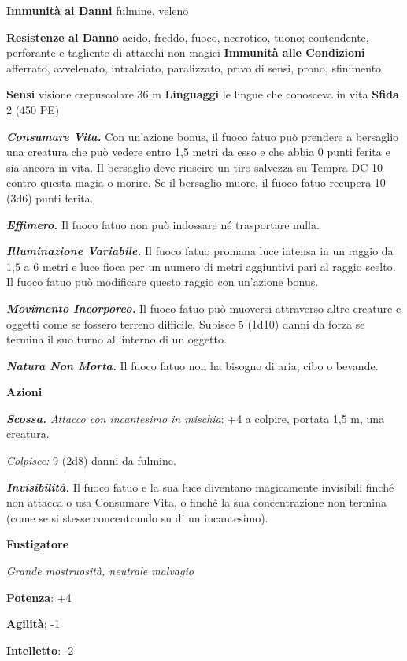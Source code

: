 \begin{multicols}{2}
\textbf{Immunità ai Danni} fulmine, veleno

\textbf{Resistenze al Danno} acido, freddo, fuoco, necrotico, tuono;
contendente, perforante e tagliente di attacchi non magici
\textbf{Immunità alle Condizioni} afferrato, avvelenato, intralciato,
paralizzato, privo di sensi, prono, sfinimento

\textbf{Sensi} visione crepuscolare 36 m
\textbf{Linguaggi} le lingue che conosceva in vita \textbf{Sfida} 2 (450
PE)

\emph{\textbf{Consumare Vita.}} Con un'azione bonus, il fuoco fatuo può
prendere a bersaglio una creatura che può vedere entro 1,5 metri da esso
e che abbia 0 punti ferita e sia ancora in vita. Il bersaglio deve
riuscire un tiro salvezza su Tempra DC 10 contro questa magia o
morire. Se il bersaglio muore, il fuoco fatuo recupera 10 (3d6) punti
ferita.

\emph{\textbf{Effimero.}} Il fuoco fatuo non può indossare né
trasportare nulla.

\emph{\textbf{Illuminazione Variabile.}} Il fuoco fatuo promana luce
intensa in un raggio da 1,5 a 6 metri e luce fioca per un numero di
metri aggiuntivi pari al raggio scelto. Il fuoco fatuo può modificare
questo raggio con un'azione bonus.

\emph{\textbf{Movimento Incorporeo.}} Il fuoco fatuo può muoversi
attraverso altre creature e oggetti come se fossero terreno difficile.
Subisce 5 (1d10) danni da forza se termina il suo turno all'interno di
un oggetto.

\emph{\textbf{Natura Non Morta.}} Il fuoco fatuo non ha bisogno di aria,
cibo o bevande.

\textbf{Azioni}

\emph{\textbf{Scossa.} Attacco con incantesimo in mischia}: +4 a
colpire, portata 1,5 m, una creatura.

\emph{Colpisce:} 9 (2d8) danni da fulmine.

\emph{\textbf{Invisibilità.}} Il fuoco fatuo e la sua luce diventano
magicamente invisibili finché non attacca o usa Consumare Vita, o finché
la sua concentrazione non termina (come se si stesse concentrando su di
un incantesimo).

\textbf{Fustigatore}

\emph{Grande mostruosità, neutrale malvagio}

\textbf{Potenza}: +4

\textbf{Agilità}: -1

\textbf{Intelletto}: -2


\end{multicols}
